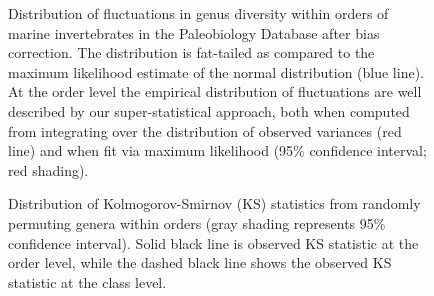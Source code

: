 \begin{figure}[!hp]
  \centering
  \caption{Distribution of fluctuations in genus diversity within
    orders of marine invertebrates in the Paleobiology Database
    \cite{alroy08} after bias correction. The distribution is
    fat-tailed as compared to the maximum likelihood estimate of the
    normal distribution (blue line).  At the order level the empirical
    distribution of fluctuations are well described by our
    super-statistical approach, both when computed from integrating
    over the distribution of observed variances (red line) and when
    fit via maximum likelihood (95\% confidence interval; red
    shading).}
  \label{fig:Px}
\end{figure}

\begin{figure}[!hp]
  \centering
  \caption{Distribution of Kolmogorov-Smirnov (KS) statistics from
    randomly permuting genera within orders (gray shading represents
    95\% confidence interval). Solid black line is observed KS
    statistic at the order level, while the dashed black line shows
    the observed KS statistic at the class level.}
  \label{fig:dStat}
\end{figure}


